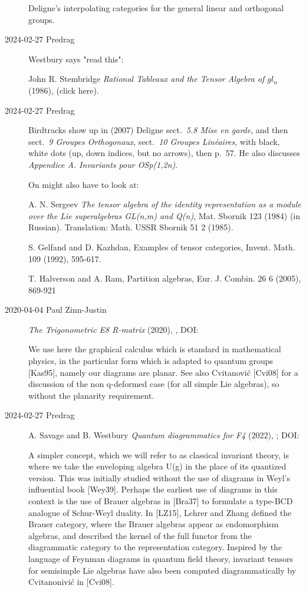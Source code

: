\begin{description}
Deligne’s interpolating categories for the
general linear and orthogonal groups.


\item[2024-02-27 Predrag] Westbury says "read this":

John R. Stembridge
{\em Rational Tableaux and the Tensor Algebra of $gl_n$} (1986),
 {(click here)}.

\item[2024-02-27 Predrag] Birdtracks show up in (2007)
Deligne sect.~{\em 5.8 Mise en garde}, and
then sect.~{\em 9 Groupes Orthogonaux},
sect.~{\em 10 Groupes Lin\'eaires}, with black, white dots (up, down indices,
but no arrows), then p.~57. He also discusses
{\em Appendice A. Invariants pour OSp(1,2n)}.

On might also have to look at:

A. N. Sergeev {\em The tensor algebra of the identity representation as a
module over the Lie superalgebras GL(n,m) and Q(n)}, Mat. Sbornik
123 (1984) (in Russian). Translation: Math. USSR Sbornik 51 2
(1985).

S. Gelfand and D. Kazhdan, Examples of tensor categories, Invent.
Math. 109 (1992), 595-617.

T. Halverson and A. Ram, Partition algebras, Eur. J. Combin. 26 6
(2005), 869-921


\item[2020-04-04 Paul Zinn-Justin]
{\em The Trigonometric E8 R-matrix} (2020), ,
 {DOI}:

We use here the graphical calculus which is standard in mathematical
physics, in the particular form which is adapted to quantum groups
[Kas95], namely our diagrams are planar. See also Cvitanovi{\'c} [Cvi08] for
a discussion of the non q-deformed case (for all simple Lie algebras), so
without the planarity requirement.

\item[2024-02-27 Predrag]
A. Savage and B. Westbury
{\em Quantum diagrammatics for F4} (2022), ;
 {DOI}:

A simpler concept, which we will refer to as classical invariant theory,
is where we take the enveloping algebra U(g) in the place of its
quantized version. This was initially studied without the use of diagrams
in Weyl’s influential book [Wey39]. Perhaps the earliest use of diagrams
in this context is the use of Brauer algebras in [Bra37] to formulate a
type-BCD analogue of Schur-Weyl duality. In [LZ15], Lehrer and Zhang
defined the Brauer category, where the Brauer algebras appear as
endomorphism algebras, and described the kernel of the full functor from
the diagrammatic category to the representation category. Inspired by the
language of Feynman diagrams in quantum field theory, invariant tensors
for semisimple Lie algebras have also been computed diagrammatically by
Cvitanonivi\'c in [Cvi08].


\end{description}
